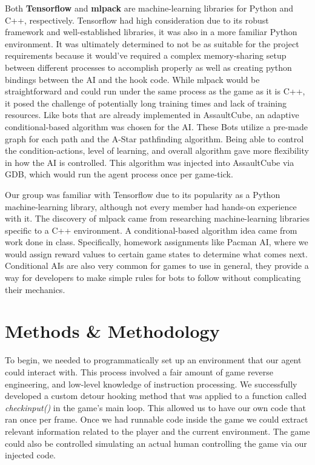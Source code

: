 \documentclass[11pt,a4paper]{article}
\begin{document}
Both \textbf{Tensorflow} and \textbf{mlpack} are machine-learning libraries for Python and C++, respectively. Tensorflow had high consideration due to its robust framework and well-established libraries, it was also in a more familiar Python environment. It was ultimately determined to not be as suitable for the project requirements because it would’ve required a complex memory-sharing setup between different processes to accomplish properly as well as creating python bindings between the AI and the hook code. While mlpack would be straightforward and could run under the same process as the game as it is C++, it posed the challenge of potentially long training times and lack of training resources. Like bots that are already implemented in AssaultCube, an adaptive conditional-based algorithm was chosen for the AI. These Bots utilize a pre-made graph for each path and the A-Star pathfinding algorithm. Being able to control the condition-actions, level of learning, and overall algorithm gave more flexibility in how the AI is controlled. This algorithm was injected into AssaultCube via GDB, which would run the agent process once per game-tick.

Our group was familiar with Tensorflow due to its popularity as a Python machine-learning library, although not every member had hands-on experience with it. The discovery of mlpack came from researching machine-learning libraries specific to a C++ environment. A conditional-based algorithm idea came from work done in class. Specifically, homework assignments like Pacman AI, where we would assign reward values to certain game states to determine what comes next. Conditional AIs are also very common for games to use in general, they provide a way for developers to make simple rules for bots to follow without complicating their mechanics.

\section{Methods \& Methodology}
To begin, we needed to programmatically set up an environment that our agent could interact with. This process involved a fair amount of game reverse engineering, and low-level knowledge of instruction processing. We successfully developed a custom detour hooking method that was applied to a function called \textit{checkinput()} in the game’s main loop. This allowed us to have our own code that ran once per frame. Once we had runnable code inside the game we could extract relevant information related to the player and the current environment. The game could also be controlled simulating an actual human controlling the game via our injected code. 
\end{document}
